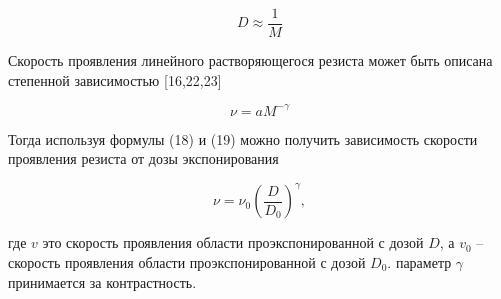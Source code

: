 \begin{equation}
D\approx \frac{1}{M}
\label{eq:A18}
\end{equation}

Скорость проявления линейного растворяющегося резиста может быть описана степенной зависимостью [16,22,23]

\begin{equation}
\nu=aM^{-\gamma}
\label{eq:A19}
\end{equation}

Тогда используя формулы (18) и (19) можно получить зависимость скорости проявления резиста от дозы экспонирования 

\begin{equation}
\nu=\nu_0\left(\frac{D}{D_0}\right)^\gamma,
\label{eq:A20}
\end{equation}

где $v$ это скорость проявления области проэкспонированной с дозой $D$, а $v_0$ -- скорость проявления области проэкспонированной с дозой $D_0$. параметр $\gamma$ принимается за контрастность. 
